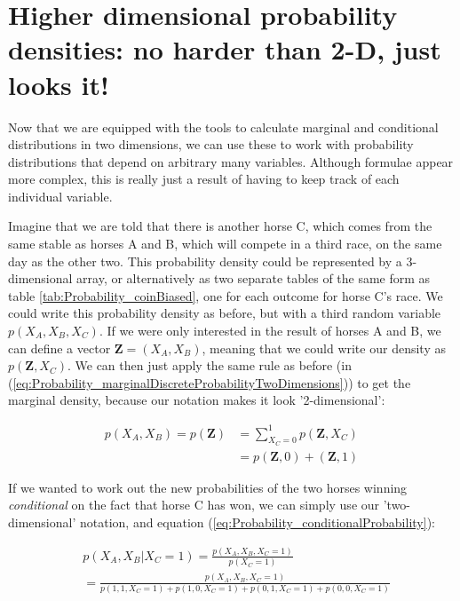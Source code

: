 \documentclass[11pt,fullpage]{book}
\begin{document}
\section{Higher dimensional probability densities: no harder than 2-D, just looks it!}
Now that we are equipped with the tools to calculate marginal and conditional distributions in two dimensions, we can use these to work with probability distributions that depend on arbitrary many variables. Although formulae appear more complex, this is really just a result of having to keep track of each individual variable.

Imagine that we are told that there is another horse C, which comes from the same stable as horses A and B, which will compete in a third race, on the same day as the other two. This probability density could be represented by a 3-dimensional array, or alternatively as two separate tables of the same form as table \ref{tab:Probability_coinBiased}, one for each outcome for horse C's race. We could write this probability density as before, but with a third random variable $p(X_A,X_B,X_C)$. If we were only interested in the result of horses A and B, we can define a vector $\boldsymbol{Z}=(X_A,X_B)$, meaning that we could write our density as $p(\boldsymbol{Z},X_C)$. We can then just apply the same rule as before (in (\ref{eq:Probability_marginalDiscreteProbabilityTwoDimensions})) to get the marginal density, because our notation makes it look '2-dimensional':

\begin{equation}\label{eq:Probability_3DDiscreteHorsesExample}
\begin{align}
p(X_A,X_B) = p(\boldsymbol{Z}) &= \sum\limits_{X_C=0}^{1} p(\boldsymbol{Z},X_C)\\
&= p(\boldsymbol{Z},0) + (\boldsymbol{Z},1)
\end{align}
\end{equation}

If we wanted to work out the new probabilities of the two horses winning \textit{conditional} on the fact that horse C has won, we can simply use our 'two-dimensional' notation, and equation (\ref{eq:Probability_conditionalProbability}):

\begin{equation}
\begin{align}
&p(X_A, X_B|X_C=1) = \frac{p(X_A,X_B,X_C=1)}{p(X_C=1)}\\
&= \frac{p(X_A,X_B,X_C=1)}{p(1,1,X_C=1) + p(1,0,X_C=1) + p(0,1,X_C=1) + p(0,0,X_C=1)}
\end{align}
\end{equation}
\end{document}
